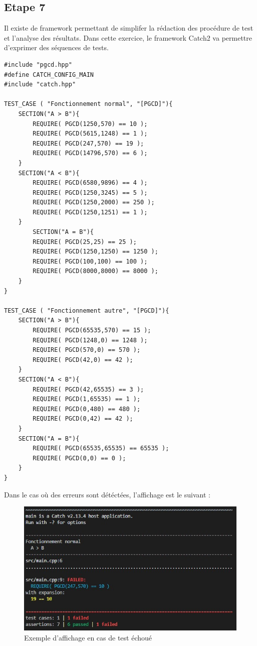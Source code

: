 \documentclass[a4paper]{article}
\begin{document}
    \subsection{Etape 7}
        Il existe de framework permettant de simplifer la rédaction des procédure de test et l'analyse des résultats.
        Dans cette exercice, le framework Catch2 va permettre d'exprimer des séquences de tests.
\begin{lstlisting}[style=CStyle]
#include "pgcd.hpp"
#define CATCH_CONFIG_MAIN
#include "catch.hpp"

TEST_CASE ( "Fonctionnement normal", "[PGCD]"){
    SECTION("A > B"){
        REQUIRE( PGCD(1250,570) == 10 );
        REQUIRE( PGCD(5615,1248) == 1 );
        REQUIRE( PGCD(247,570) == 19 );
        REQUIRE( PGCD(14796,570) == 6 );
    }
    SECTION("A < B"){
        REQUIRE( PGCD(6580,9896) == 4 );
        REQUIRE( PGCD(1250,3245) == 5 );
        REQUIRE( PGCD(1250,2000) == 250 );
        REQUIRE( PGCD(1250,1251) == 1 );
    }
        SECTION("A = B"){
        REQUIRE( PGCD(25,25) == 25 );
        REQUIRE( PGCD(1250,1250) == 1250 );
        REQUIRE( PGCD(100,100) == 100 );
        REQUIRE( PGCD(8000,8000) == 8000 );
    }
}

TEST_CASE ( "Fonctionnement autre", "[PGCD]"){
    SECTION("A > B"){
        REQUIRE( PGCD(65535,570) == 15 );
        REQUIRE( PGCD(1248,0) == 1248 );
        REQUIRE( PGCD(570,0) == 570 );
        REQUIRE( PGCD(42,0) == 42 );
    }
    SECTION("A < B"){
        REQUIRE( PGCD(42,65535) == 3 );
        REQUIRE( PGCD(1,65535) == 1 );
        REQUIRE( PGCD(0,480) == 480 );
        REQUIRE( PGCD(0,42) == 42 );
    }
    SECTION("A = B"){
        REQUIRE( PGCD(65535,65535) == 65535 );
        REQUIRE( PGCD(0,0) == 0 );
    }
}    
\end{lstlisting}        
        Dans le cas où des erreurs sont détéctées, l'affichage est le suivant :
        \begin{figure}[H]
            \centering
            \includegraphics[scale=0.6]{Pictures/test_failed.jpg}
            \caption{Exemple d'affichage en cas de test échoué}
            \label{fig:Test_failed}
        \end{figure}
\end{document}
